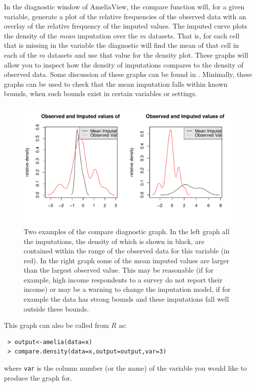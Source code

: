 \documentclass[12pt,titlepage]{article}
\begin{document}
In the diagnostic window of AmeliaView, the compare function will, for
a given variable, generate a plot of the relative frequencies of the
observed data with an overlay of the relative frequency of the imputed
values.  The imputed curve plots the density of the \emph{mean}
imputation over the $m$ datasets.  That is, for each cell that is
missing in the variable the diagnostic will find the mean of that
cell in each of the $m$ datasets and use that value for the density
plot.  These graphs will allow you to inspect how the density of
imputations compares to the density of observed data. Some discussion
of these graphs can be found in \citet*{AbaGelLev05}.  Minimally, these
graphs can be used to check that the mean imputation falls within
known bounds, when such bounds exist in certain variables or settings.
\begin{figure}[htp!]
  \centering \includegraphics[scale=.8]{comp}
  \caption{Two examples of the compare diagnostic graph.  In the left
    graph all the imputations, the density of which is shown in black,
    are contained within the range of the observed data for this
    variable (in red).  In the right graph some of the mean imputed
    values are larger than the largest observed value.  This may be
    reasonable (if for example, high income respondents to a survey do
    not report their income) or may be a warning to change the
    imputation model, if for example the data has strong bounds and
    these imputations fall well outside these bounds.}
  \label{f:oi1}
\end{figure}


This graph can also be called from $R$ as:
\begin{verbatim}
 > output<-amelia(data=x) 
 > compare.density(data=x,output=output,var=3)
\end{verbatim}
where \texttt{var} is the column number (or the name) of the variable
you would like to produce the graph for.
\end{document}

